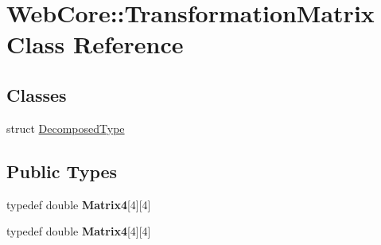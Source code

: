 \hypertarget{class_web_core_1_1_transformation_matrix}{}\section{Web\+Core\+:\+:Transformation\+Matrix Class Reference}
\label{class_web_core_1_1_transformation_matrix}
\subsection*{Classes}
\begin{DoxyCompactItemize}
\item 
struct \mbox{\hyperlink{struct_web_core_1_1_transformation_matrix_1_1_decomposed_type}{Decomposed\+Type}}
\end{DoxyCompactItemize}
\subsection*{Public Types}
\begin{DoxyCompactItemize}
\item 
\mbox{\label{class_web_core_1_1_transformation_matrix_ac508929892dc7eb5994edef20d9d8fbd}} 
typedef double {\bfseries Matrix4}\mbox{[}4\mbox{]}\mbox{[}4\mbox{]}
\item 
\mbox{\label{class_web_core_1_1_transformation_matrix_ac508929892dc7eb5994edef20d9d8fbd}} 
typedef double {\bfseries Matrix4}\mbox{[}4\mbox{]}\mbox{[}4\mbox{]}
\end{DoxyCompactItemize}
